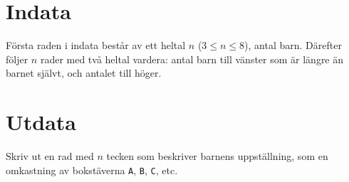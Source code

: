 \section*{Indata}
Första raden i indata består av ett heltal $n$ ($3 \le n \le 8$), antal barn.
Därefter följer $n$ rader med två heltal vardera: antal barn till vänster som är längre än barnet självt, och antalet till höger.

\section*{Utdata}
Skriv ut en rad med $n$ tecken som beskriver barnens uppställning, som en omkastning av bokstäverna \texttt{A}, \texttt{B}, \texttt{C}, etc.
